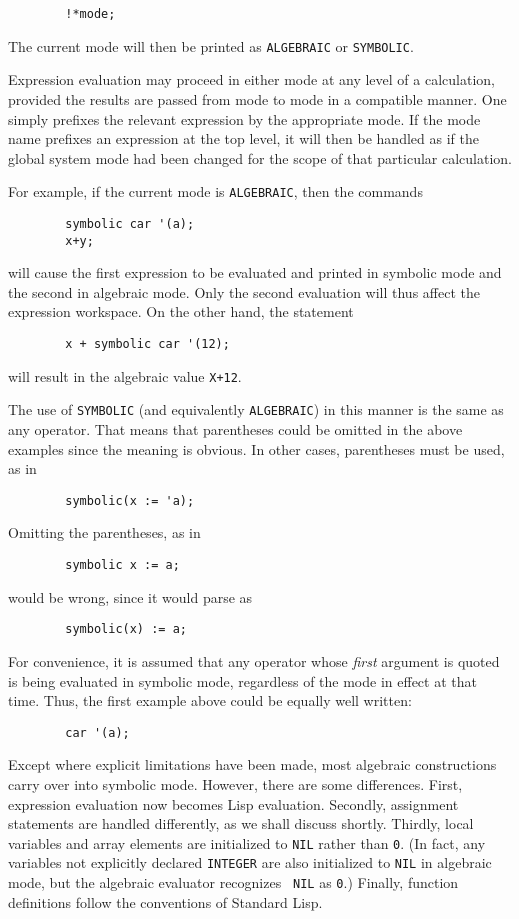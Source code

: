 \begin{verbatim}
        !*mode;
\end{verbatim}
The current mode will then be printed as {\tt ALGEBRAIC} or {\tt SYMBOLIC}.

Expression evaluation may proceed in either mode at any level of a
calculation, provided the results are passed from mode to mode in a
compatible manner. One simply prefixes the relevant expression by the
appropriate mode. If the mode name prefixes an expression at the top
level, it will then be handled as if the global system mode had been
changed for the scope of that particular calculation.

For example, if the current mode is {\tt ALGEBRAIC}, then the commands
\begin{verbatim}
        symbolic car '(a);
        x+y;
\end{verbatim}
will cause the first expression to be evaluated and printed in symbolic
mode and the second in algebraic mode. Only the second evaluation will
thus affect the expression workspace. On the other hand, the statement
\begin{verbatim}
        x + symbolic car '(12);
\end{verbatim}
will result in the algebraic value {\tt X+12}.

The use of {\tt SYMBOLIC} (and equivalently {\tt ALGEBRAIC}) in this
manner is the same as any operator.  That means that parentheses could be
omitted in the above examples since the meaning is obvious.  In other
cases, parentheses must be used, as in

\begin{verbatim}
        symbolic(x := 'a);
\end{verbatim}
Omitting the parentheses, as in
\begin{verbatim}
        symbolic x := a;
\end{verbatim}
would be wrong, since it would parse as
\begin{verbatim}
        symbolic(x) := a;
\end{verbatim}
For convenience, it is assumed that any operator whose {\em first} argument is
quoted is being evaluated in symbolic mode, regardless of the mode in
effect at that time. Thus, the first example above could be equally well
written:
\begin{verbatim}
        car '(a);
\end{verbatim}
Except where explicit limitations have been made, most {\REDUCE} algebraic
constructions carry over into symbolic mode. 
However, there are some differences.  First, expression evaluation now
becomes Lisp evaluation.  Secondly, assignment statements are handled
differently, as we shall discuss shortly.  Thirdly, local variables and array
elements are initialized to {\tt NIL} rather than {\tt 0}. (In fact, any
variables not explicitly declared {\tt INTEGER} are also initialized to
{\tt NIL} in algebraic mode, but the algebraic evaluator recognizes {\tt
NIL} as {\tt 0}.) Finally, function definitions follow the conventions of
Standard Lisp.

